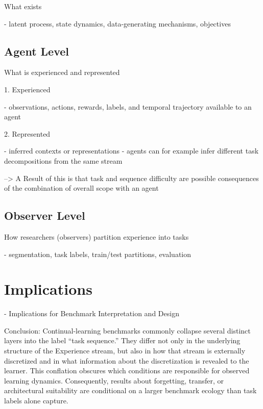 \documentclass{article}
\begin{document}
            What exists

            - latent process, state dynamics, data-generating mechanisms, objectives

        
        \subsection{Agent Level}
        
            What is experienced and represented

            1. Experienced

            - observations, actions, rewards, labels, and temporal trajectory available to an agent

            2. Represented

            - inferred contexts or representations
            - agents can for example infer different task decompositions from the same stream

            
            --> A Result of this is that task and sequence difficulty are possible consequences of the combination of overall scope with an agent
            
        
        \subsection{Observer Level}
        
            How researchers (observers) partition experience into tasks

            - segmentation, task labels, train/test partitions, evaluation
             
    
    \section{Implications}

        - Implications for Benchmark Interpretation and Design

        Conclusion: 
        Continual-learning benchmarks commonly collapse several distinct layers into the label “task sequence.” They differ not only in the underlying structure of the Experience stream, but also in how that stream is externally discretized and in what information about the discretization is revealed to the learner. This conflation obscures which conditions are responsible for observed learning dynamics. Consequently, results about forgetting, transfer, or architectural suitability are conditional on a larger benchmark ecology than task labels alone capture.
\end{document}
